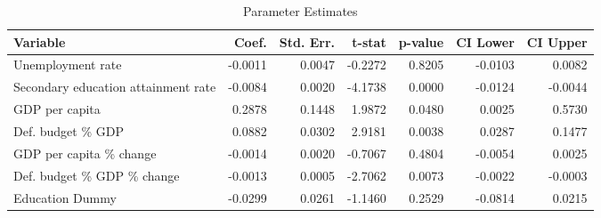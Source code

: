 \begin{table}[htbp]
\centering
\begin{threeparttable}
\caption{Parameter Estimates}
\label{tab:parameter_estimates}
\begin{tabularx}{\textwidth}{@{}Xrrrrrr@{}}
\toprule
\textbf{Variable} & \textbf{Coef.} & \textbf{Std. Err.} & \textbf{t-stat} & \textbf{p-value} & \textbf{CI Lower} & \textbf{CI Upper} \\
\midrule
Unemployment rate & -0.0011 & 0.0047 & -0.2272 & 0.8205 & -0.0103 & 0.0082 \\
Secondary education attainment rate & -0.0084 & 0.0020 & -4.1738 & 0.0000 & -0.0124 & -0.0044 \\
GDP per capita & 0.2878 & 0.1448 & 1.9872 & 0.0480 & 0.0025 & 0.5730 \\
Def. budget \% GDP & 0.0882 & 0.0302 & 2.9181 & 0.0038 & 0.0287 & 0.1477 \\
GDP per capita \% change & -0.0014 & 0.0020 & -0.7067 & 0.4804 & -0.0054 & 0.0025 \\
Def. budget \% GDP \% change & -0.0013 & 0.0005 & -2.7062 & 0.0073 & -0.0022 & -0.0003 \\
Education Dummy & -0.0299 & 0.0261 & -1.1460 & 0.2529 & -0.0814 & 0.0215 \\
\bottomrule
\end{tabularx}
\end{threeparttable}
\label{tab:final_model}
\end{table}